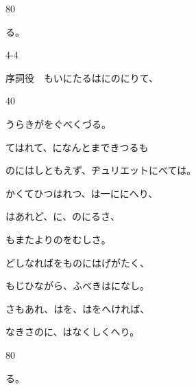 \documentclass[tate,paper=b6j,jafontsize=9pt]{jlreq}
\begin{document}

\begin{azconvIndented}{8\zw}{0\zw}

る。

\end{azconvIndented}
\begin{azconvIndented}{4\zw}{-4\zw}

序詞役　もいにたるはにのにりて、

\end{azconvIndented}
\begin{azconvIndented}{4\zw}{0\zw}

うらきがをぐべくづる。

てはれて、になんとまできつるも

のにはしともえず、ヂュリエットにべては。

かくてひつはれつ、は一ににへり、

はあれど、に、のにるさ、

もまたよりのをむしさ。

どしなればをものにはげがたく、

もじひながら、ふべきはになし。

さもあれ、はを、はをへければ、

なきさのに、はなくしくへり。

\end{azconvIndented}
\begin{azconvIndented}{8\zw}{0\zw}

る。

\end{azconvIndented}
\end{document}
